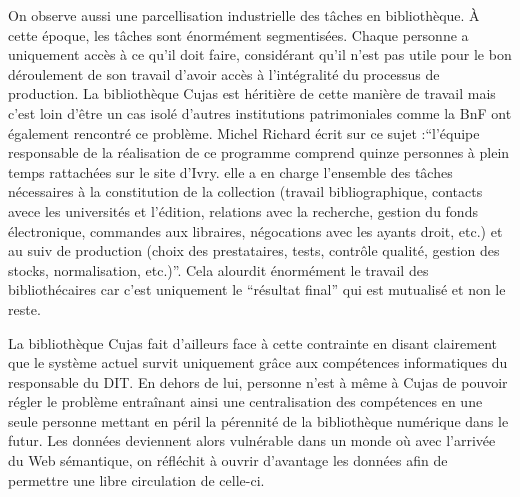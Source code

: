 On observe aussi une parcellisation industrielle des tâches en bibliothèque. À cette époque, les tâches sont énormément segmentisées. Chaque personne a uniquement accès à ce qu'il doit faire, considérant qu'il n'est pas utile pour le bon déroulement de son travail d'avoir accès à l'intégralité du processus de production. La bibliothèque Cujas est héritière de cette manière de travail mais c'est loin d'être un cas isolé d'autres institutions patrimoniales comme la BnF ont également rencontré ce problème. Michel Richard écrit sur ce sujet :\enquote{l'équipe responsable de la réalisation de ce programme comprend quinze personnes à plein temps rattachées sur le site d'Ivry. elle a en charge l'ensemble des tâches nécessaires à la constitution de la collection (travail bibliographique, contacts avece les universités et l'édition, relations avec la recherche, gestion du fonds électronique, commandes aux libraires, négocations avec les ayants droit, etc.) et au suiv de production (choix des prestataires, tests, contrôle qualité, gestion des stocks, normalisation, etc.)}. Cela alourdit énormément le travail des bibliothécaires car c'est uniquement le \enquote{résultat final} qui est mutualisé et non le reste.  

La bibliothèque Cujas fait d'ailleurs face à cette contrainte en disant clairement que le système actuel survit uniquement grâce aux compétences informatiques du responsable du DIT. En dehors de lui, personne n'est à même à Cujas de pouvoir régler le problème entraînant ainsi une centralisation des compétences en une seule personne mettant en péril la pérennité de la bibliothèque numérique dans le futur. Les données deviennent alors vulnérable dans un monde où avec l'arrivée du Web sémantique, on réfléchit à ouvrir d'avantage les données afin de permettre une libre circulation de celle-ci.